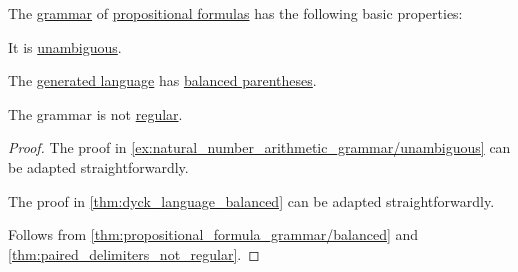 \begin{proposition}\label{thm:propositional_formula_grammar}
  The \hyperref[def:formal_grammar]{grammar} of \hyperref[def:propositional_formula]{propositional formulas} has the following basic properties:
  \begin{thmenum}
     It is \hyperref[def:grammar_ambiguity]{unambiguous}.

     The \hyperref[def:formal_grammar/language]{generated language} has \hyperref[def:paired_delimiters]{balanced parentheses}.

     The grammar is not \hyperref[def:chomsky_hierarchy/regular]{regular}.
  \end{thmenum}
\end{proposition}
\begin{proof}
   The proof in \cref{ex:natural_number_arithmetic_grammar/unambiguous} can be adapted straightforwardly.

   The proof in \cref{thm:dyck_language_balanced} can be adapted straightforwardly.

   Follows from \cref{thm:propositional_formula_grammar/balanced} and \cref{thm:paired_delimiters_not_regular}.
\end{proof}

